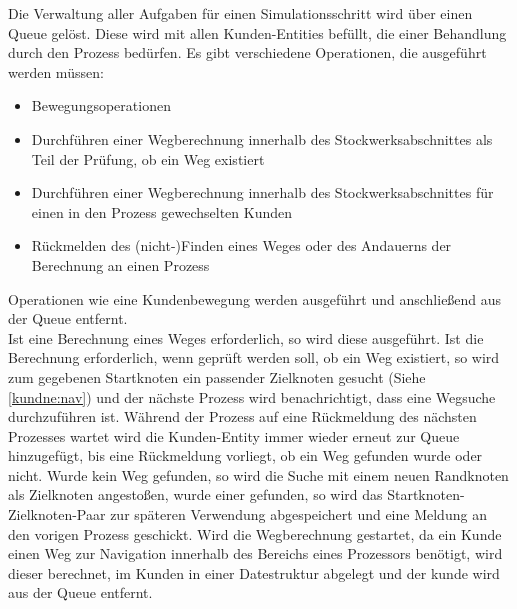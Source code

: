 Die Verwaltung aller Aufgaben für einen Simulationsschritt wird über einen Queue gelöst. Diese wird mit allen Kunden-Entities befüllt, die einer Behandlung durch den Prozess bedürfen.
Es gibt verschiedene Operationen, die ausgeführt werden müssen:
\begin{itemize}
\item Bewegungsoperationen
\item Durchführen einer Wegberechnung innerhalb des Stockwerksabschnittes als Teil der Prüfung, ob ein Weg existiert
\item Durchführen einer Wegberechnung innerhalb des Stockwerksabschnittes für einen in den Prozess gewechselten Kunden
\item Rückmelden des (nicht-)Finden eines Weges oder des Andauerns der Berechnung an einen Prozess
\end{itemize}
Operationen wie eine Kundenbewegung werden ausgeführt und anschließend aus der Queue entfernt.\\
Ist eine Berechnung eines Weges erforderlich, so wird diese ausgeführt. Ist die Berechnung erforderlich, wenn geprüft werden soll, ob ein Weg existiert, so wird zum gegebenen Startknoten ein passender Zielknoten gesucht (Siehe \ref{kundne:nav}) und der nächste Prozess wird benachrichtigt, dass eine Wegsuche durchzuführen ist. Während der Prozess auf eine Rückmeldung des nächsten Prozesses wartet wird die Kunden-Entity immer wieder erneut zur Queue hinzugefügt, bis eine Rückmeldung vorliegt, ob ein Weg gefunden wurde oder nicht. Wurde kein Weg gefunden, so wird die Suche mit einem neuen Randknoten als Zielknoten angestoßen, wurde einer gefunden, so wird das Startknoten-Zielknoten-Paar zur späteren Verwendung abgespeichert und eine Meldung an den vorigen Prozess geschickt. Wird die Wegberechnung gestartet, da ein Kunde einen Weg zur Navigation innerhalb des Bereichs eines Prozessors benötigt, wird dieser berechnet, im Kunden in einer Datestruktur abgelegt und der kunde wird aus der Queue entfernt.